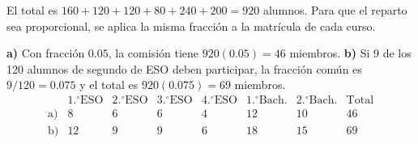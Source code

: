 El total es $160+120+120+80+240+200=920$ alumnos.
Para que el reparto sea proporcional, se aplica la misma
fracción a la matrícula de cada curso.

\textbf{a)} Con fracción $0.05$, la comisión tiene $920(0.05)=46$
miembros. \textbf{b)} Si 9 de los 120 alumnos de segundo de ESO
deben participar, la fracción común es $9/120=0.075$ y el total es
$920(0.075)=69$ miembros.
\[
\begin{array}{c|rrrrrr|r}
 &1.^\circ\mathrm{ESO}&2.^\circ\mathrm{ESO}&3.^\circ\mathrm{ESO}&
4.^\circ\mathrm{ESO}&1.^\circ\mathrm{Bach.}&2.^\circ\mathrm{Bach.}&\text{Total}\\\hline
\text{a)}&8&6&6&4&12&10&46\\
\text{b)}&12&9&9&6&18&15&69
\end{array}
\]
